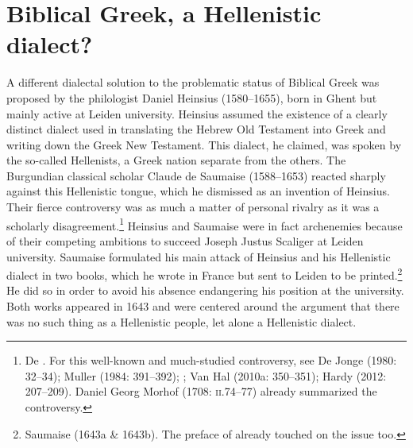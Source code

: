 \section{Biblical Greek, a Hellenistic dialect?}

A different dialectal solution to the problematic status of Biblical Greek was proposed by the philologist Daniel Heinsius (1580–1655), born in Ghent but mainly active at Leiden university. Heinsius assumed the existence of a clearly distinct dialect used in translating the Hebrew Old Testament into Greek and writing down the Greek New Testament. This dialect, he claimed, was spoken by the so-called Hellenists, a Greek nation separate from the others. The Burgundian classical scholar Claude de Saumaise (1588–1653) reacted sharply against this Hellenistic tongue, which he dismissed as an invention of Heinsius. Their fierce controversy was as much a matter of personal rivalry as it was a scholarly disagreement.\footnote{De \citet[32]{Jonge1980}. For this well-known and much-studied controversy, see De Jonge (1980: 32–34); Muller (1984: 391–392); \citet{Considine2010}; Van Hal (2010a: 350–351); Hardy (2012: 207–209). Daniel Georg Morhof (1708: \textsc{ii.}74–77) already summarized the controversy.} Heinsius and Saumaise were in fact archenemies because of their competing ambitions to succeed Joseph Justus Scaliger at Leiden university. Saumaise formulated his main attack of Heinsius and his Hellenistic dialect in two books, which he wrote in France but sent to Leiden to be printed.\footnote{Saumaise (1643a \& 1643b). The preface of \citet{Saumaise1639} already touched on the issue too.} He did so in order to avoid his absence endangering his position at the university. Both works appeared in 1643 and were centered around the argument that there was no such thing as a Hellenistic people, let alone a Hellenistic dialect.

